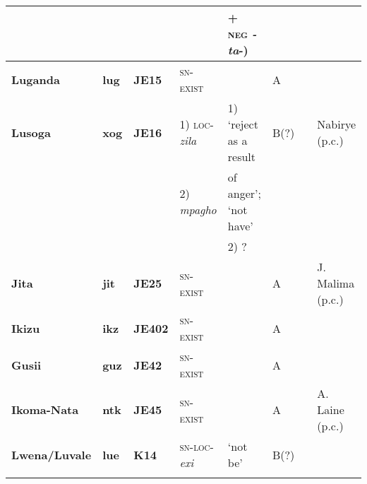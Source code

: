 \documentclass[output=paper]{langscibook}
\begin{document}
\begin{sidewaystable}[p]
\begin{scriptsize}
\begin{tabularx}{\textwidth}{llllllll}
				&				&				&				&+ \textsc{neg} \textit{-ta}-)\\\midrule
\textbf{Luganda}	&\textbf{lug}		&\textbf{JE15}	&\textsc{sn-exist}	&\textendash								&A{}	&												&\citet{AshtonMulira1954}\\\midrule
\textbf{Lusoga}	&\textbf{xog}	&\textbf{JE16}	&1) \textsc{loc}-\textit{zila}&1) `reject as a result			&B(?) 	&												&Nabirye (p.c.)\\
				&				&				&2) \textit{mpagho} &of anger'; `not have'\\
				&				&				&				&2) ?\\\midrule
\textbf{Jita}		&\textbf{jit}		&\textbf{JE25}	&\textsc{sn-exist}	&\textendash								&A{}	& 												&J. Malima (p.c.)\\\midrule
\textbf{Ikizu} 	&\textbf{ikz}		&\textbf{JE402}	&\textsc{sn-exist}	&\textendash								&A{}	& 												&\citet{Gray2013}\\\midrule
\textbf{Gusii} 	&\textbf{guz} 	&\textbf{JE42} 	&\textsc{sn-exist}	&\textendash								&A{}	& 												&\citet{Whiteley1956}\\\midrule
\textbf{Ikoma-Nata}&\textbf{ntk}	&\textbf{JE45} 	&\textsc{sn-exist}	&\textendash								&A{}	& 												&A. Laine (p.c.)\\\midrule
\textbf{Lwena/Luvale} &\textbf{lue}&\textbf{K14}	&\textsc{sn-loc}-\textit{exi}&`not be'						&B(?)	&												&\citet{Horton1949}\\
\lspbottomrule
\end{tabularx}\end{scriptsize}
\end{sidewaystable}
\end{document}
